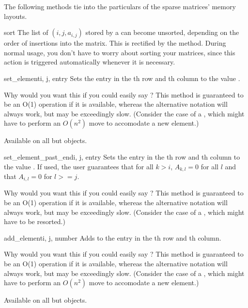 The following methods tie into the particulars of the sparse matrices'
memory layouts.

\begin{methoddesc}[SparseBuildMatrix]{sort}{}
  The list of $(i,j,a_{i,j})$ stored by a 
  can become unsorted, depending on the order of insertions into the
  matrix.  This is rectified by the  method. During
  normal usage, you don't have to worry about sorting your matrices,
  since this action is triggered automatically whenever it is
  necessary.
\end{methoddesc}
\begin{methoddesc}{set_element}{i, j, entry}
  Sets the entry in the th row and th column to the
  value .

  Why would you want this if you could easily say ? This method is guaranteed to be an O(1) operation if it is
  available, whereas the alternative notation will always work, but
  may be exceedingly slow. (Consider the case of a
  , which might have to perform an $O(n^2)$
  move to accomodate a new element.)

  Available on all but  objects.
\end{methoddesc}
\begin{methoddesc}[Matrix]{set_element_past_end}{i, j, entry}
  Sets the entry in the th row and th column to the
  value . If used, the user guarantees that for all
  $k>i$, $A_{k,l}=0$ for all $l$ and that $A_{i,l}=0$ for $l>=j$.

  Why would you want this if you could easily say ? This method is guaranteed to be an O(1) operation if 
  it is available, whereas the alternative notation will always
  work, but may be exceedingly slow. (Consider the case of a
  , which might have to be resorted.)
\end{methoddesc}
\begin{methoddesc}[Matrix]{add_element}{i, j, number}
  Adds  to the entry in the th row and th
  column.

  Why would you want this if you could easily say ? This method is guaranteed to be an O(1) operation if it is
  available, whereas the alternative notation will always work, but
  may be exceedingly slow. (Consider the case of a
  , which might have to perform an $O(n^2)$
  move to accomodate a new element.)

  Available on all but  objects.
\end{methoddesc}
